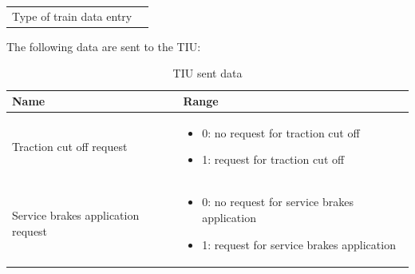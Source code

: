 \documentclass[nocc]{template/openetcs_report}
\begin{document}
\begin{longtable}{|l|l|}
				&	\begin{minipage}[t]{0.5\linewidth}
					\end{minipage} \\					
				\hline
				\begin{minipage}[t]{0.5\linewidth} Type of train data entry	\end{minipage} 
				&	\begin{minipage}[t]{0.5\linewidth}
					\end{minipage} \\					
				\hline
			\end{longtable}
				
The following data are sent to the TIU:	
			\begin{longtable}{|l|l|}
				\caption{TIU sent data}\\ 
				\hline
				
					\begin{minipage}[t]{0.5\linewidth} \textbf{Name}	\end{minipage} 
				&	\begin{minipage}[t]{0.5\linewidth} \textbf{Range} \end{minipage} \\
				\hline
					\begin{minipage}[t]{0.5\linewidth}Traction cut off request	\end{minipage} 
				&	\begin{minipage}[t]{0.5\linewidth}
						\begin{itemize}
							\item 0: no request for traction cut off
							\item 1: request for traction cut off
						\end{itemize}
					\end{minipage} \\
				\hline
				\begin{minipage}[t]{0.5\linewidth} Service brakes application request	\end{minipage} 
				&	\begin{minipage}[t]{0.5\linewidth}
						\begin{itemize}
							\item 0: no request for service brakes application
							\item 1: request for service brakes application
						\end{itemize}
					\end{minipage} \\
				\hline
				

\end{longtable}
\end{document}
